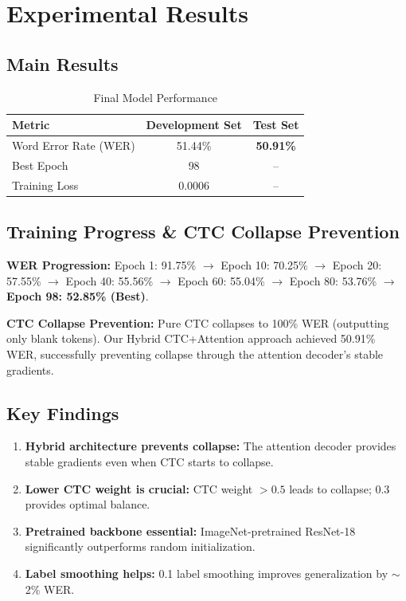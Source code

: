 \documentclass[12pt,a4paper]{article}
\begin{document}
\section{Experimental Results}

\subsection{Main Results}

\begin{table}[H]
\centering
\caption{Final Model Performance}
\begin{tabular}{@{}lcc@{}}
\toprule
\textbf{Metric} & \textbf{Development Set} & \textbf{Test Set} \\
\midrule
Word Error Rate (WER) & 51.44\% & \textbf{50.91\%} \\
Best Epoch & 98 & -- \\
Training Loss & 0.0006 & -- \\
\bottomrule
\end{tabular}
\end{table}

\subsection{Training Progress \& CTC Collapse Prevention}

\textbf{WER Progression:} Epoch 1: 91.75\% $\rightarrow$ Epoch 10: 70.25\% $\rightarrow$ Epoch 20: 57.55\% $\rightarrow$ Epoch 40: 55.56\% $\rightarrow$ Epoch 60: 55.04\% $\rightarrow$ Epoch 80: 53.76\% $\rightarrow$ \textbf{Epoch 98: 52.85\% (Best)}.

\textbf{CTC Collapse Prevention:} Pure CTC collapses to 100\% WER (outputting only blank tokens). Our Hybrid CTC+Attention approach achieved 50.91\% WER, successfully preventing collapse through the attention decoder's stable gradients.

\subsection{Key Findings}

\begin{enumerate}[noitemsep]
    \item \textbf{Hybrid architecture prevents collapse:} The attention decoder provides stable gradients even when CTC starts to collapse.
    
    \item \textbf{Lower CTC weight is crucial:} CTC weight $> 0.5$ leads to collapse; 0.3 provides optimal balance.
    
    \item \textbf{Pretrained backbone essential:} ImageNet-pretrained ResNet-18 significantly outperforms random initialization.
    
    \item \textbf{Label smoothing helps:} 0.1 label smoothing improves generalization by $\sim$2\% WER.
\end{enumerate}
\end{document}
